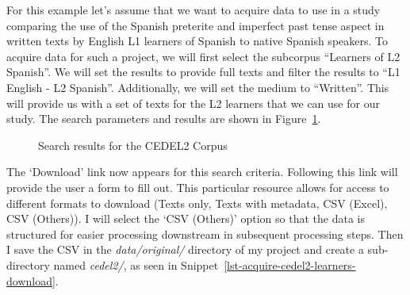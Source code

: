 \documentclass[
  letterpaper,
]{book}
\theoremstyle{definition}
\theoremstyle{remark}
\begin{document}
For this example let's assume that we want to acquire data to use in a
study comparing the use of the Spanish preterite and imperfect past
tense aspect in written texts by English L1 learners of Spanish to
native Spanish speakers. To acquire data for such a project, we will
first select the subcorpus ``Learners of L2 Spanish''. We will set the
results to provide full texts and filter the results to ``L1 English -
L2 Spanish''. Additionally, we will set the medium to ``Written''. This
will provide us with a set of texts for the L2 learners that we can use
for our study. The search parameters and results are shown in
Figure~\ref{fig-acquire-cedel2-results}.

\begin{figure}[!htb]


\caption{\label{fig-acquire-cedel2-results}Search results for the CEDEL2
Corpus}

\end{figure}%

The `Download' link now appears for this search criteria. Following this
link will provide the user a form to fill out. This particular resource
allows for access to different formats to download (Texts only, Texts
with metadata, CSV (Excel), CSV (Others)). I will select the `CSV
(Others)' option so that the data is structured for easier processing
downstream in subsequent processing steps. Then I save the CSV in the
\emph{data/original/} directory of my project and create a sub-directory
named \emph{cedel2/}, as seen in
Snippet~\ref{lst-acquire-cedel2-learners-download}.
\end{document}

